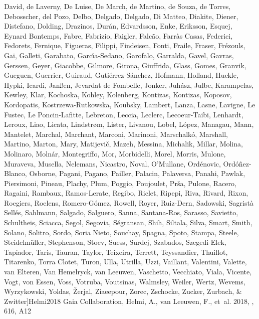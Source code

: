 \documentclass[longauth]{aa} %
\begin{document}
\begin{thebibliography}{112}
{		{David}, {de Laverny}, {De Luise}, {De March}, {de Martino}, {de Souza}, {de
			Torres}, {Debosscher}, {del Pozo}, {Delbo}, {Delgado}, {Delgado}, {Di
			Matteo}, {Diakite}, {Diener}, {Distefano}, {Dolding}, {Drazinos},
		{Dur{\'a}n}, {Edvardsson}, {Enke}, {Eriksson}, {Esquej}, {Eynard Bontemps},
		{Fabre}, {Fabrizio}, {Faigler}, {Falc{\~a}o}, {Farr{\`a}s Casas}, {Federici},
		{Fedorets}, {Fernique}, {Figueras}, {Filippi}, {Findeisen}, {Fonti},
		{Fraile}, {Fraser}, {Fr{\'e}zouls}, {Gai}, {Galleti}, {Garabato},
		{Garc{\'\i}a-Sedano}, {Garofalo}, {Garralda}, {Gavel}, {Gavras}, {Gerssen},
		{Geyer}, {Giacobbe}, {Gilmore}, {Girona}, {Giuffrida}, {Glass}, {Gomes},
		{Granvik}, {Gueguen}, {Guerrier}, {Guiraud}, {Guti{\'e}rrez-S{\'a}nchez},
		{Hofmann}, {Holland}, {Huckle}, {Hypki}, {Icardi}, {Jan{\ss}en}, {Jevardat de
			Fombelle}, {Jonker}, {Juh{\'a}sz}, {Julbe}, {Karampelas}, {Kewley}, {Klar},
		{Kochoska}, {Kohley}, {Kolenberg}, {Kontizas}, {Kontizas}, {Koposov},
		{Kordopatis}, {Kostrzewa-Rutkowska}, {Koubsky}, {Lambert}, {Lanza}, {Lasne},
		{Lavigne}, {Le Fustec}, {Le Poncin-Lafitte}, {Lebreton}, {Leccia}, {Leclerc},
		{Lecoeur-Taibi}, {Lenhardt}, {Leroux}, {Liao}, {Licata}, {Lindstr{\o}m},
		{Lister}, {Livanou}, {Lobel}, {L{\'o}pez}, {Managau}, {Mann}, {Mantelet},
		{Marchal}, {Marchant}, {Marconi}, {Marinoni}, {Marschalk{\'o}}, {Marshall},
		{Martino}, {Marton}, {Mary}, {Matijevi{\v{c}}}, {Mazeh}, {Messina},
		{Michalik}, {Millar}, {Molina}, {Molinaro}, {Moln{\'a}r}, {Montegriffo},
		{Mor}, {Morbidelli}, {Morel}, {Morris}, {Mulone}, {Muraveva}, {Musella},
		{Nelemans}, {Nicastro}, {Noval}, {O'Mullane}, {Ord{\'e}novic},
		{Ord{\'o}{\~n}ez-Blanco}, {Osborne}, {Pagani}, {Pagano}, {Pailler},
		{Palacin}, {Palaversa}, {Panahi}, {Pawlak}, {Piersimoni}, {Pineau}, {Plachy},
		{Plum}, {Poggio}, {Poujoulet}, {Pr{\v{s}}a}, {Pulone}, {Racero}, {Ragaini},
		{Rambaux}, {Ramos-Lerate}, {Regibo}, {Riclet}, {Ripepi}, {Riva}, {Rivard},
		{Rixon}, {Roegiers}, {Roelens}, {Romero-G{\'o}mez}, {Rowell}, {Royer},
		{Ruiz-Dern}, {Sadowski}, {Sagrist{\`a} Sell{\'e}s}, {Sahlmann}, {Salgado},
		{Salguero}, {Sanna}, {Santana-Ros}, {Sarasso}, {Savietto}, {Schultheis},
		{Sciacca}, {Segol}, {Segovia}, {S{\'e}gransan}, {Shih}, {Siltala}, {Silva},
		{Smart}, {Smith}, {Solano}, {Solitro}, {Sordo}, {Soria Nieto}, {Souchay},
		{Spagna}, {Spoto}, {Stampa}, {Steele}, {Steidelm{\"u}ller}, {Stephenson},
		{Stoev}, {Suess}, {Surdej}, {Szabados}, {Szegedi-Elek}, {Tapiador}, {Taris},
		{Tauran}, {Taylor}, {Teixeira}, {Terrett}, {Teyssandier}, {Thuillot},
		{Titarenko}, {Torra Clotet}, {Turon}, {Ulla}, {Utrilla}, {Uzzi}, {Vaillant},
		{Valentini}, {Valette}, {van Elteren}, {Van Hemelryck}, {van Leeuwen},
		{Vaschetto}, {Vecchiato}, {Viala}, {Vicente}, {Vogt}, {von Essen}, {Voss},
		{Votruba}, {Voutsinas}, {Walmsley}, {Weiler}, {Wertz}, {Wevems},
		{Wyrzykowski}, {Yoldas}, {{\v{Z}}erjal}, {Ziaeepour}, {Zorec}, {Zschocke},
		{Zucker}, {Zurbach}, \& {Zwitter}}]{Helmi2018}
	{Gaia Collaboration}, {Helmi}, A., {van Leeuwen}, F., {et~al.}
	2018{}, \aap, 616, A12
	

\end{thebibliography}
\end{document}
